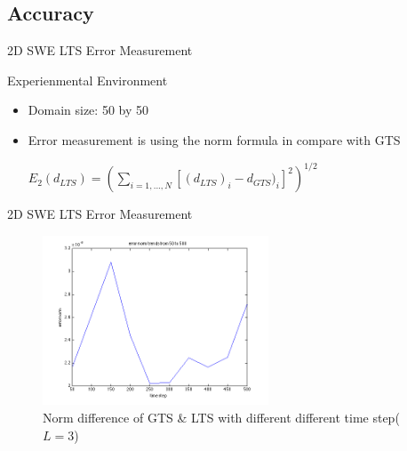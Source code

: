 \documentclass{beamer}
\begin{document}
\subsection{Accuracy}
\begin{frame}[t]{2D SWE LTS Error Measurement}
  \begin{block}{Experienmental Environment}
        \begin{itemize}
            \item Domain size: 50 by 50
            \item Error measurement is using the norm formula in compare with GTS\\
            \begin{center}
            	$E_{2}(d_{LTS}) = (\sum_{i=1,...,N}^{ }[(d_{LTS})_{i} - d_{GTS})_{i}]^{2})^{1/2}$
            \end{center}
        \end{itemize}
    \end{block}
\end{frame}
\begin{frame}{2D SWE LTS Error Measurement}
\begin{figure}[p]
    \centering
    \includegraphics[width=0.6\textwidth]{2d_lts_error}
    \caption{Norm difference of GTS \& LTS with different different time step($L=3$)}
    \label{fig:awesome_image}
\end{figure}
\end{frame}
\end{document}
